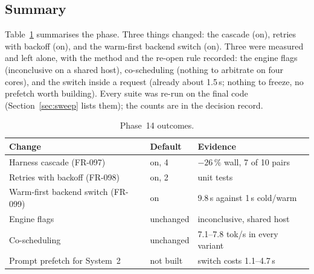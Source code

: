 \subsection{Summary}

Table~\ref{tab:p14} summarises the phase. Three things changed: the cascade (on), retries with backoff (on), and the warm-first
backend switch (on). Three were measured and left alone, with the method and the re-open rule recorded: the engine flags
(inconclusive on a shared host), co-scheduling (nothing to arbitrate on four cores), and the switch inside a request (already
about 1.5\,s; nothing to freeze, no prefetch worth building). Every suite was re-run on the final code (Section~\ref{sec:sweep}
lists them); the counts are in the decision record.

\begin{table}[t]
\centering
\caption{Phase~14 outcomes.}
\label{tab:p14}
\scriptsize
\begin{tabular}{@{}p{3.2cm}p{1.4cm}p{2.2cm}@{}}
\toprule
Change & Default & Evidence \\
\midrule
Harness cascade (FR-097) & on, 4 & $-26\,\%$ wall, 7 of 10 pairs \\
Retries with backoff (FR-098) & on, 2 & unit tests \\
Warm-first backend switch (FR-099) & on & 9.8\,s against 1\,s cold/warm \\
Engine flags & unchanged & inconclusive, shared host \\
Co-scheduling & unchanged & 7.1--7.8 tok/s in every variant \\
Prompt prefetch for System~2 & not built & switch costs 1.1--4.7\,s \\
\bottomrule
\end{tabular}
\end{table}

